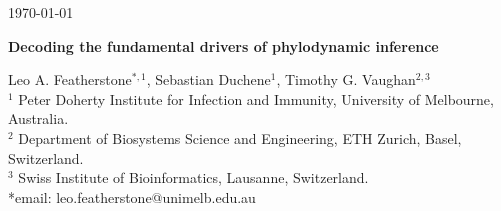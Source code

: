 \documentclass{article}
\begin{document}
\begin{flushright}
\today
\end{flushright}
\begin{center}
\begin{LARGE}
    \textbf{Decoding the fundamental drivers of phylodynamic inference}
\end{LARGE}
\end{center}
Leo A. Featherstone$^{\ast,1}$, Sebastian Duchene$^1$, Timothy G. Vaughan$^{2,3}$\\
$^{1}$ Peter Doherty Institute for Infection and Immunity, University of Melbourne, Australia.\\
$^{2}$ Department of Biosystems Science and Engineering, ETH Zurich, Basel, Switzerland.\\
$^{3}$ Swiss Institute of Bioinformatics, Lausanne, Switzerland.\\
*email: leo.featherstone@unimelb.edu.au
\end{document}
